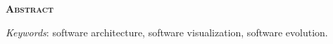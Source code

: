 \begin{center}
	{\Large{\textbf{\mscThesisEnglishTitle}}}
\end{center}

\vspace{1cm}


\vspace{1cm}

\begin{center}
	\Large{\textsc{\textbf{Abstract}}}
\end{center}


\noindent\textit{Keywords}: software architecture, software visualization, software evolution.